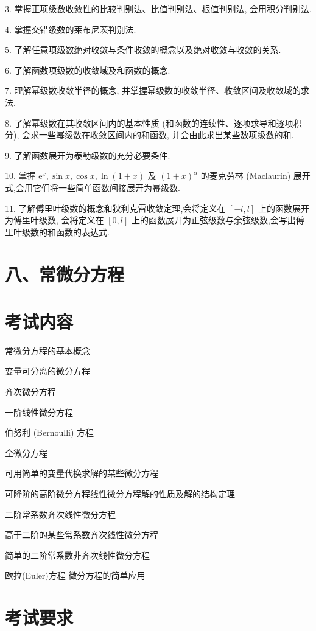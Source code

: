 \documentclass[10pt]{article}
\begin{document}
3. 掌握正项级数收敛性的比较判别法、比值判别法、根值判别法, 会用积分判别法.

4. 掌握交错级数的莱布尼茨判别法.

5. 了解任意项级数绝对收敛与条件收敛的概念以及绝对收敛与收敛的关系.

6. 了解函数项级数的收敛域及和函数的概念.

7. 理解幂级数收敛半径的概念, 并掌握幂级数的收敛半径、收敛区间及收敛域的求法.

8. 了解幂级数在其收敛区间内的基本性质 (和函数的连续性、逐项求导和逐项积分), 会求一些幂级数在收敛区间内的和函数, 并会由此求出某些数项级数的和.

9. 了解函数展开为泰勒级数的充分必要条件.

10. 掌握 \({\mathrm{e}}^{x},\sin x,\cos x,\ln \left( {1 + x}\right)\) 及 \({\left( 1 + x\right) }^{\alpha }\) 的麦克劳林 (Maclaurin) 展开式,会用它们将一些简单函数间接展开为幂级数.

11. 了解傅里叶级数的概念和狄利克雷收敛定理,会将定义在 \(\left\lbrack  {-l,l}\right\rbrack\) 上的函数展开为傅里叶级数, 会将定义在 \(\left\lbrack  {0,l}\right\rbrack\) 上的函数展开为正弦级数与余弦级数,会写出傅里叶级数的和函数的表达式.

\section*{八、常微分方程}

\section*{考试内容}

常微分方程的基本概念 

变量可分离的微分方程 

齐次微分方程 

一阶线性微分方程 

伯努利 (Bernoulli) 方程 

全微分方程 

可用简单的变量代换求解的某些微分方程 

可降阶的高阶微分方程线性微分方程解的性质及解的结构定理 

二阶常系数齐次线性微分方程 

高于二阶的某些常系数齐次线性微分方程 

简单的二阶常系数非齐次线性微分方程 

欧拉(Euler)方程 微分方程的简单应用

\section*{考试要求}
\end{document}
